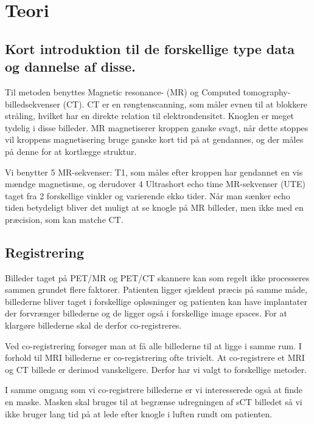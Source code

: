 \section{Teori}
\subsection{Kort introduktion til de forskellige type data og dannelse af disse.}



Til metoden benyttes Magnetic resonance- (MR) og Computed
tomography-billedsekvenser (CT). CT er en røngtenscanning, som måler
evnen til at blokkere stråling, hvilket har en direkte relation til
elektrondensitet. Knoglen er meget tydelig i disse billeder. MR magnetiserer
kroppen ganske svagt, når dette stoppes vil kroppens magnetisering bruge
ganske kort tid på at gendannes, og der måles på denne for at kortlægge
struktur.

Vi benytter 5 MR-sekvenser: T1, som måles efter kroppen har gendannet en vis
mændge magnetisme, og derudover 4 Ultrashort echo time MR-sekvenser (UTE)
taget fra 2 forskellige vinkler og varierende ekko tider. Når man sænker echo
tiden betydeligt bliver det muligt at se knogle på MR billeder, men ikke med
en præcision, som kan matche CT.


\subsection{Registrering}


Billeder taget på PET/MR og PET/CT skannere kan som regelt ikke processeres
sammen grundet flere faktorer. Patienten ligger sjældent præcis på samme
måde, billederne bliver taget i forskellige opløsninger og patienten kan have
implantater der forvrænger billederne og de ligger også i forskellige image
spaces. For at klargøre billederne skal de derfor co-registreres.

Ved co-registrering forsøger man at få alle billederne til at ligge i samme
rum. I forhold til MRI billederne er co-registrering ofte trivielt. At
co-registrere et MRI og CT billede er derimod vanskeligere. Derfor har vi valgt
to forskellige metoder.


I samme omgang som vi co-registrere billederne er vi interesserede også
at finde en maske. Masken skal bruges til at begrænse udregningen af sCT
billedet så vi ikke bruger lang tid på at lede efter knogle i luften rundt om
patienten.

